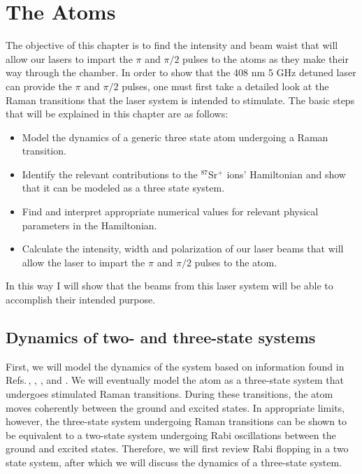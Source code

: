 \chapter{The Atoms} \label{ChapterAboutTheAtoms}

The objective of this chapter is to find the intensity and beam waist that will allow our lasers to impart the $\pi$ and $\pi/2$ pulses to the atoms as they make their way through the chamber. In order to show that the 408 nm 5 GHz detuned laser can provide the $\pi$ and $\pi/2$ pulses, one must first take a detailed look at the Raman transitions that the laser system is intended to stimulate.
The basic steps that will be explained in this chapter are as follows:
\begin{itemize}
\item Model the dynamics of a generic three state atom undergoing a Raman transition.
\item Identify the relevant contributions to the $^{87}$Sr$^+$ ions' Hamiltonian and show that it can be modeled as a three state system.
\item Find and interpret appropriate numerical values for relevant physical parameters in the Hamiltonian.
\item Calculate the intensity, width and polarization of our laser beams that will allow the laser to impart the $\pi$ and $\pi/2$ pulses to the atom. 
\end{itemize}
In this way I will show that the beams from this laser system will be able to accomplish their intended purpose.

\section{Dynamics of two- and three-state systems}\label{dynamicsSection}

First, we will model the dynamics of the system based on information found in Refs.\,\cite{Young1997363}, \cite{gustavsonThesis}, \cite{footAtomicPhysics}, \cite{cjeDiss} and \cite{RamanBeamSplit}. 
We will eventually model the atom as a three-state system that undergoes stimulated Raman transitions. During these transitions, the atom moves coherently between the ground and excited states. In appropriate limits, however, the three-state system undergoing Raman transitions can be shown to be equivalent to a two-state system undergoing Rabi oscillations between the ground and excited states. Therefore, we will first review Rabi flopping in a two state system, after which we will discuss the dynamics of a three-state system. 

